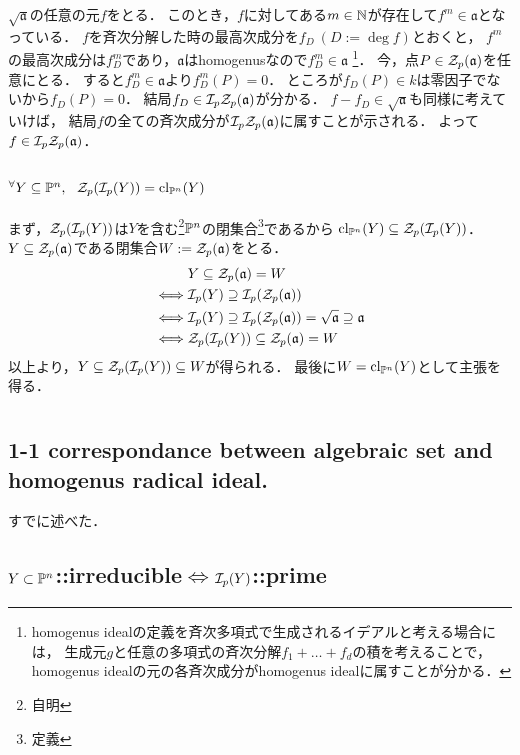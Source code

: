 \documentclass[a4paper]{jarticle}
\newcommand{\I}[1]{\mathfrak{#1}}
\begin{document}
    $\sqrt{\I{a}}$の任意の元$f$をとる．
    このとき，$f$に対してある$m \in \mathbb{N}$が存在して$f^m \in \I{a}$となっている．
    $f$を斉次分解した時の最高次成分を$f_D~(D:=\deg f)$とおくと，
    $f^m$の最高次成分は$f_D^m$であり，$\I{a}$はhomogenusなので$f_D^m \in \I{a}$
    \footnote{homogenus idealの定義を斉次多項式で生成されるイデアルと考える場合には，
    生成元$g$と任意の多項式の斉次分解$f_1+\dots+f_d$の積を考えることで，
    homogenus idealの元の各斉次成分がhomogenus idealに属すことが分かる．}．
    今，点$P \in \zerosp(\I{a})$を任意にとる．
    すると$f_D^m \in \I{a}$より$f_D^m(P)=0$．
    ところが$f_D(P) \in k$は零因子でないから$f_D(P)=0$．
    結局$f_D \in \defsp \zerosp(\I{a})$が分かる．
    $f-f_D \in \sqrt{\I{a}}$も同様に考えていけば，
    結局$f$の全ての斉次成分が$\defsp \zerosp(\I{a})$に属すことが示される．
    よって$f \in \defsp \zerosp(\I{a})$．


    \subsection{ ${}^{\forall} Y \subseteq \mathbb{P}^n,~~ \mathcal{Z}_p(\mathcal{I}_p(Y))=\operatorname{cl}_{\mathbb{P}^n}(Y)$}
    まず，$\mathcal{Z}_p(\mathcal{I}_p(Y))$は$Y$を含む\footnote{自明}$\mathbb{P}^n$の閉集合\footnote{定義}であるから
    $\operatorname{cl}_{\mathbb{P}^n}(Y) \subseteq \mathcal{Z}_p(\mathcal{I}_p(Y))$．
    $Y \subseteq \zerosp(\I{a})$である閉集合$W:=\zerosp(\I{a})$をとる．
    \begin{align*}
        {}&     Y \subseteq \zerosp(\I{a})=W \\
        \iff&   \defsp(Y) \supseteq \defsp(\zerosp(\I{a})) \\
        \iff&   \defsp(Y) \supseteq \defsp(\zerosp(\I{a}))=\sqrt{\I{a}} \supseteq \I{a} \\
        \iff&   \zerosp(\defsp(Y)) \subseteq \zerosp(\I{a})=W
    \end{align*}
    以上より，$Y \subseteq \mathcal{Z}_p(\mathcal{I}_p(Y)) \subseteq W$が得られる．
    最後に$W=\operatorname{cl}_{\mathbb{P}^n}(Y)$として主張を得る．

\section{} %
    \subsection{1-1 correspondance between algebraic set and homogenus radical ideal.}
    すでに述べた．

    \subsection{ $Y \subset \mathbb{P}^n$::irreducible$\iff$$\mathcal{I}_p(Y)$::prime}
\end{document}
